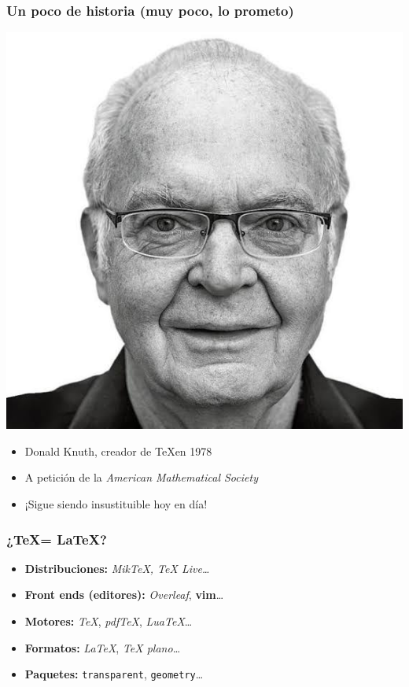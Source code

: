 \begin{frame}
    \frametitle{Un poco de historia (muy poco, lo prometo)}
    \begin{minipage}[c]{0.45\textwidth}
        \includegraphics[width=\textwidth]{images/knuth.jpeg}
    \end{minipage}
    \hfill
    \begin{minipage}[c]{0.45\textwidth}
        \begin{itemize}
            \item{Donald Knuth, creador de \TeX en 1978}
            \item{A petición de la \emph{American Mathematical Society}}
            \item{¡Sigue siendo insustituible hoy en día!}
        \end{itemize}
    \end{minipage}
\end{frame}

\begin{frame}
\frametitle{¿\TeX = \LaTeX?}
\begin{itemize}
    \item{\textbf{Distribuciones:} \emph{MikTeX, TeX Live\dots}}
    \item{\textbf{Front ends (editores):} \emph{Overleaf}, \textbf{vim}\dots}
    \item{\textbf{Motores:} \emph{TeX}, \emph{pdfTeX}, \emph{LuaTeX}\dots}
    \item{\textbf{Formatos:} \emph{LaTeX}, \emph{TeX plano}\dots}
    \item{\textbf{Paquetes:} \texttt{transparent}, \texttt{geometry}\dots}
\end{itemize}
\end{frame}
